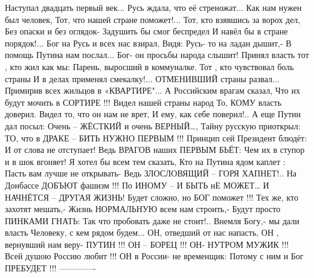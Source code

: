 Наступал двадцать первый век...
Русь ждала, что её стреножат...
Как нам нужен был человек,
Тот, что нашей стране поможет!...
Тот, кто взявшись за ворох дел,
Без опаски и без оглядок-
Задушить бы смог беспредел
И навёл бы в стране порядок!...
Бог на Русь и всех нас взирал,
Видя: Русь- то на ладан дышит,-
В помощь Путина нам послал...
Бог- он просьбы народа слышит!
Принял власть тот , кто жил как мы:
Парень, выросший в коммуналке.
Тот , кто чувствовал боль страны
И в делах применял смекалку!...
ОТМЕНИВШИЙ страны развал...
Примирив всех жильцов в «КВАРТИРЕ"...
А Российским врагам сказал,
Что их будут мочить в СОРТИРЕ !!!
Видел нашей страны народ
То, КОМУ власть доверил.
Видел то, что он нам не врет,
И ему, как себе поверил!..
А еще Путин дал посыл:
Очень – ЖЁСТКИЙ и очень ВЕРНЫЙ…,
Тайну русскую приоткрыл:
ТО, что в ДРАКЕ – БИТЬ НУЖНО ПЕРВЫМ !!!
Принцип сей Президент блюдёт:
И от слова не отступает!
Ведь ВРАГОВ наших ПЕРВЫМ БЬЁТ:
Чем их в ступор и в шок вгоняет!
Я хотел бы всем тем сказать,
Кто на Путина ядом каплет :
Пасть вам лучше не открывать-
Ведь ЗЛОСЛОВЯЩИЙ – ГОРЯ ХАПНЕТ!..
На Донбассе ДОБЪЮТ фашизм !!!
По ИНОМУ – И БЫТЬ нЕ МОЖЕТ…
И НАЧНЁТСЯ – ДРУГАЯ ЖИЗНЬ!
Будет сложно, но БОГ поможет !!!
Тех же, кто захотят мешать,-
Жизнь НОРМАЛЬНУЮ всем нам строить,-
Будут просто ПИНКАМИ ГНАТЬ:
Так что пробовать даже не стоит!..
Внемля Богу,- мы дали власть
Человеку, с кем рядом будем...
ОН, отведший от нас напасть,
ОН , вернувший нам веру- ПУТИН !!!
ОН – БОРЕЦ !!! ОН- НУТРОМ МУЖИК !!!
Всей душою Россию любит !!!
ОН в России- не временщик:
Потому с ним и Бог ПРЕБУДЕТ !!!
-------------
